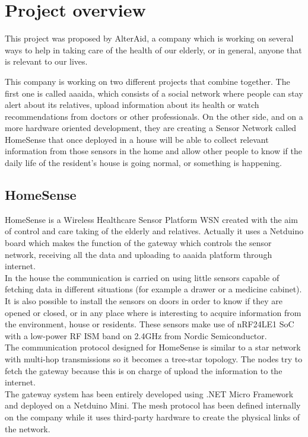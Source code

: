 \chapter{Project overview}\label{C:project-overview}
This project was proposed by AlterAid, a company which is working on several ways to help in taking care of the health of our elderly, or in general, anyone that is relevant to our lives.

This company is working on two different projects that combine together. The first one is called aaaida, which consists of a social network where people can stay alert about its relatives, upload information about its health or watch recommendations from doctors or other professionals. On the other side, and on a more hardware oriented development, they are creating a Sensor Network called HomeSense that once deployed in a house will be able to collect relevant information from those sensors in the home and allow other people to know if the daily life of the resident's house is going normal, or something is happening.

\section{HomeSense}\label{S:HomeSense}
HomeSense is a Wireless Healthcare Sensor Platform \gls{WSN} created with the aim of control and care taking of the elderly and relatives. Actually it uses a Netduino board which makes the function of the gateway which controls the sensor network, receiving all the data and uploading to aaaida platform through internet.
\\
In the house the communication is carried on using little sensors capable of fetching data in different situations (for example a drawer or a medicine cabinet). It is also possible to install the sensors on doors in order to know if they are opened or closed, or in any place where is interesting to acquire information from the environment, house or residents. These sensors make use of nRF24LE1 \gls{SoC} with a low-power RF \gls{ISM} band on 2.4GHz from Nordic Semiconductor.
\\
The communication protocol designed for HomeSense is similar to a star network with multi-hop transmissions so it becomes a tree-star topology. The nodes try to fetch the gateway because this is on charge of upload the information to the internet.
\\
The gateway system has been entirely developed using .NET Micro Framework and deployed on a Netduino Mini. The mesh protocol has been defined internally on the company while it uses third-party hardware to create the physical links of the network.

